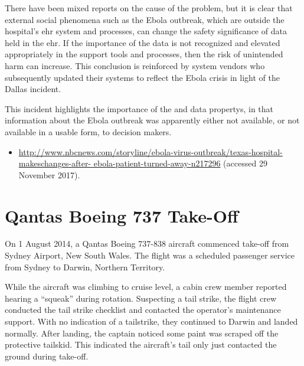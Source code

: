 There have been mixed reports on the cause of the problem, but it is clear that external social phenomena such as the Ebola outbreak, which are outside the hospital's \gls{ehr} system and processes, can change the safety significance of data held in the \gls{ehr}. If the importance of the data is not recognized and elevated appropriately in the support tools and processes, then the risk of unintended harm can increase. This conclusion is reinforced by system vendors who subsequently updated their systems to reflect the Ebola crisis in light of the Dallas incident.

This incident highlights the importance of the  and  \glspl{data property}, in that \gls{information} about the Ebola outbreak was apparently either not available, or not available in a usable form, to decision makers.

\begin{samepage}
\begin{itemize}
  \item \raggedright{\href{http://www.nbcnews.com/storyline/ebola-virus-outbreak/texas-hospital-makeschanges-after-ebola-patient-turned-away-n217296}{http://www.nbcnews.com/storyline/ebola-virus-outbreak/texas-hospital-makeschanges-after- ebola-patient-turned-away-n217296} (accessed 29 November 2017).} 
\end{itemize}
\end{samepage}


\section{Qantas Boeing 737 Take-Off} \label{bkm:incacc:qantastakeoff}
On 1 August 2014, a Qantas Boeing 737-838 aircraft commenced take-off from Sydney Airport, New South Wales. The flight was a scheduled passenger service from Sydney to Darwin, Northern Territory.

While the aircraft was climbing to cruise level, a cabin crew member reported hearing a ``squeak'' during rotation. Suspecting a tail strike, the flight crew conducted the tail strike checklist and contacted the operator's maintenance support. With no indication of a tailstrike, they continued to Darwin and landed normally. After landing, the captain noticed some paint was scraped off the protective tailskid. This indicated the aircraft's tail only just contacted the ground during take-off.

